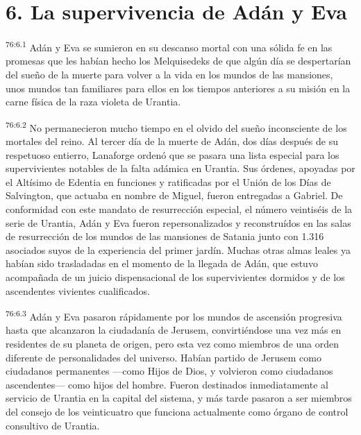 \section*{6. La supervivencia de Adán y Eva}
\par
\textsuperscript{76:6.1} Adán y Eva se sumieron en su descanso mortal con una sólida fe en las promesas que les habían hecho los Melquisedeks de que algún día se despertarían del sueño de la muerte para volver a la vida en los mundos de las mansiones, unos mundos tan familiares para ellos en los tiempos anteriores a su misión en la carne física de la raza violeta de Urantia.

\par
\textsuperscript{76:6.2} No permanecieron mucho tiempo en el olvido del sueño inconsciente de los mortales del reino. Al tercer día de la muerte de Adán, dos días después de su respetuoso entierro, Lanaforge ordenó que se pasara una lista especial para los supervivientes notables de la falta adámica en Urantia. Sus órdenes, apoyadas por el Altísimo de Edentia en funciones y ratificadas por el Unión de los Días de Salvington, que actuaba en nombre de Miguel, fueron entregadas a Gabriel. De conformidad con este mandato de resurrección especial, el número veintiséis de la serie de Urantia, Adán y Eva fueron repersonalizados y reconstruídos en las salas de resurrección de los mundos de las mansiones de Satania junto con 1.316 asociados suyos de la experiencia del primer jardín. Muchas otras almas leales ya habían sido trasladadas en el momento de la llegada de Adán, que estuvo acompañada de un juicio dispensacional de los supervivientes dormidos y de los ascendentes vivientes cualificados.

\par
\textsuperscript{76:6.3} Adán y Eva pasaron rápidamente por los mundos de ascensión progresiva hasta que alcanzaron la ciudadanía de Jerusem, convirtiéndose una vez más en residentes de su planeta de origen, pero esta vez como miembros de una orden diferente de personalidades del universo. Habían partido de Jerusem como ciudadanos permanentes ---como Hijos de Dios, y volvieron como ciudadanos ascendentes--- como hijos del hombre. Fueron destinados inmediatamente al servicio de Urantia en la capital del sistema, y más tarde pasaron a ser miembros del consejo de los veinticuatro que funciona actualmente como órgano de control consultivo de Urantia.

